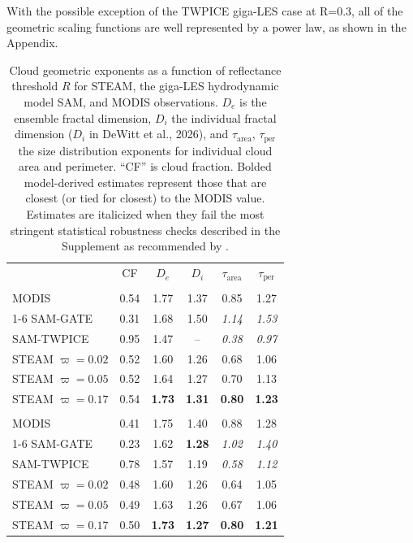 \documentclass[acp, manuscript, english]{copernicus}
\begin{document}
With the possible exception of the TWPICE giga-LES case at R=0.3, all of the geometric scaling functions are well represented by a power law, as shown in the Appendix. 

\begin{table}[t]
\caption{Cloud geometric exponents as a function of reflectance threshold $R$ for STEAM, the giga-LES hydrodynamic model SAM, and MODIS observations. $D_e$ is the ensemble fractal dimension, $D_i$ the individual fractal dimension ($D_i$ in DeWitt et al., 2026), and $\tau_{\mathrm{area}}$, $\tau_{\mathrm{per}}$ the size distribution exponents for individual cloud area and perimeter. ``CF'' is cloud fraction. Bolded model-derived estimates represent those that are closest (or tied for closest) to the MODIS value. Estimates are italicized when they fail the most stringent statistical robustness checks described in the Supplement as recommended by \citet{dewitt2024b, dewitt2026,dewitt2026objscale}.}
\label{tab:cloud geometry}
\begin{tabular}{lccccc}
\tophline
 & CF & $D_e$ & $D_i$ & $\tau_{\mathrm{area}}$ & $\tau_{\mathrm{per}}$ \\
\middlehline
\multicolumn{6}{l}{\textbf{$R > 0.1$}} \\
MODIS & 0.54 & 1.77 & 1.37 & 0.85 & 1.27 \\
\cline{1-6}
SAM-GATE & 0.31 & 1.68 & 1.50 & \textit{1.14} & \textit{1.53} \\
SAM-TWPICE & 0.95 & 1.47 & -- & \textit{0.38} & \textit{0.97} \\
STEAM $\varpi = 0.02$ & 0.52 & 1.60 & 1.26 & 0.68 & 1.06 \\
STEAM $\varpi = 0.05$ & 0.52 & 1.64 & 1.27 & 0.70 & 1.13 \\
STEAM $\varpi = 0.17$ & {0.54} & \textbf{1.73} & \textbf{1.31} & \textbf{0.80} & \textbf{1.23} \\
\middlehline
\multicolumn{6}{l}{\textbf{$R > 0.2$}} \\
MODIS & 0.41 & 1.75 & 1.40 & 0.88 & 1.28 \\
\cline{1-6}
SAM-GATE & 0.23 & 1.62 & \textbf{1.28} & \textit{1.02} & \textit{1.40} \\
SAM-TWPICE & 0.78 & 1.57 & 1.19 & \textit{0.58} & \textit{1.12} \\
STEAM $\varpi = 0.02$ & {0.48} & 1.60 & 1.26 & 0.64 & 1.05 \\
STEAM $\varpi = 0.05$ & {0.49} & 1.63 & 1.26 & 0.67 & 1.06 \\
STEAM $\varpi = 0.17$ & 0.50 & \textbf{1.73} & \textbf{1.27} & \textbf{0.80} & \textbf{1.21} \\

\end{tabular}
\end{table}
\end{document}
